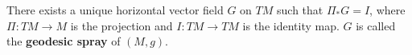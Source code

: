 There exists a unique horizontal vector field $G$ on $TM$ such that $\Pi_* G = I$, where $\Pi: TM \to M$ is the projection and $I: TM \to TM$ is the identity map. $G$ is called the \textbf{geodesic spray} of $(M, g)$.
